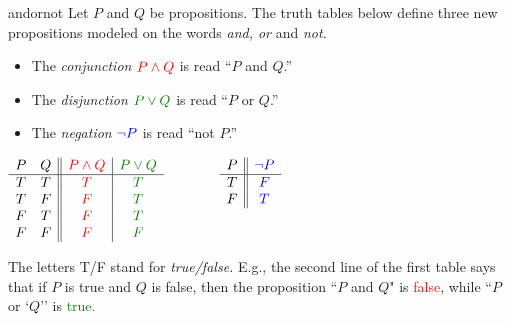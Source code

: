 \begin{defn}{}{andornot}
	Let $P$ and $Q$ be propositions. The truth tables below define three new propositions modeled on the words \emph{and, or} and \emph{not.}\par
	\begin{minipage}[t]{0.5\linewidth}\vspace{0pt}
		\begin{itemize}
		  \item The \emph{conjunction} $\textcolor{red}{P\wedge Q}$ is read ``$P$ and $Q$.''
		  \item The \emph{disjunction} $\textcolor{Green}{P\vee Q}$ is read ``$P$ or $Q$.''
		  \item The \emph{negation} $\textcolor{blue}{\neg P}$ is read ``not $P$.''
		\end{itemize} 
	\end{minipage}
	\hfill
	\begin{minipage}[t]{0.49\linewidth}\vspace{-2pt}
		$\begin{array}{cc||c|c}
			P & Q & \textcolor{red}{P\wedge Q} & \textcolor{Green}{P\vee Q}\\\hline
			T & T & \textcolor{red}{T} & \textcolor{Green}{T}\\
			T & F & \textcolor{red}{F} & \textcolor{Green}{T}\\
			F & T & \textcolor{red}{F} & \textcolor{Green}{T}\\
			F & F & \textcolor{red}{F} & \textcolor{Green}{F}
		\end{array}
		\qquad\qquad
		\begin{array}[b]{c||c}
			P & \textcolor{blue}{\neg P}\\\hline
			T & \textcolor{blue}{F}\\
			F & \textcolor{blue}{T}
		\end{array}$
	\end{minipage}
\end{defn}

The letters T/F stand for \emph{true/false.} E.g., the second line of the first table says that if $P$ is true and $Q$ is false, then the proposition ``$P$ and $Q$" is \textcolor{red}{false}, while ``$P$ or `$Q$'' is \textcolor{Green}{true.}


